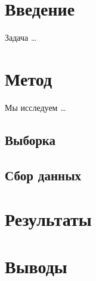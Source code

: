 \documentclass{article}
\begin{document}
\section{Введение}
Задача \dots
\section{Метод}
Мы исследуем \dots
\subsection{Выборка}
\subsection{Сбор данных}
\section{Результаты}
\section{Выводы}
\end{document}
